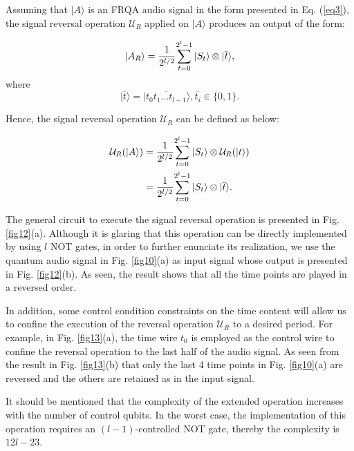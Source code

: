 \documentclass[10pt,journal,compsoc]{IEEEtran}
\begin{document}
Assuming that $\vert A\rangle$ is an FRQA audio signal in the form presented in Eq. (\ref{eq3}), the signal reversal operation $\mathcal{U}_R$ applied on $\vert A \rangle$ produces an output of the form:

\begin{equation}\label{eq29}
\vert A_R \rangle = {1\over 2^{l/2}}{\sum_{t=0}^{2^{l} - 1}{\vert S_t\rangle}\otimes \vert \overline{t}\rangle}, \notag
\end{equation}
where
\begin{equation}
\vert \overline{t} \rangle = \vert \overline{t_0t_1\ldots t_{l-1}} \rangle, \overline{t_i}\in\{0, 1\}.
\end{equation}

Hence, the signal reversal operation $\mathcal{U}_R$ can be defined as below:

\begin{equation}\label{eq30}
\begin{aligned}
\mathcal{U}_R(\vert A \rangle)& = {1\over 2^{l/2}}{\sum_{t=0}^{2^{l} - 1}{\vert S_t\rangle}\otimes \mathcal{U}_R(\vert t\rangle)} \\
& = {1\over 2^{l/2}}{\sum_{t=0}^{2^{l} - 1}{\vert S_t\rangle}\otimes \vert \overline{t}\rangle}.
\end{aligned}
\end{equation}

The general circuit to execute the signal reversal operation is presented in Fig. \ref{fig12}(a). Although it is glaring that this operation can be directly implemented by using $l$ NOT gates, in order to further enunciate its realization, we use the quantum audio signal in Fig. \ref{fig10}(a) as input signal whose output is presented in Fig. \ref{fig12}(b). As seen, the result shows that all the time points are played in a reversed order.

In addition, some control condition constraints on the time content will allow us to confine the execution of the reversal operation $\mathcal{U}_R$ to a desired period. For example, in Fig. \ref{fig13}(a), the time wire $t_0$ is employed as the control wire to confine the reversal operation to the last half of the audio signal. As seen from the result in Fig. \ref{fig13}(b) that only the last 4 time points in Fig. \ref{fig10}(a) are reversed and the others are retained as in the input signal.

It should be mentioned that the complexity of the extended operation increases with the number of control qubits. In the worst case, the implementation of this operation requires an $(l-1)$-controlled NOT gate, thereby the complexity is $12l - 23$.
\end{document}
